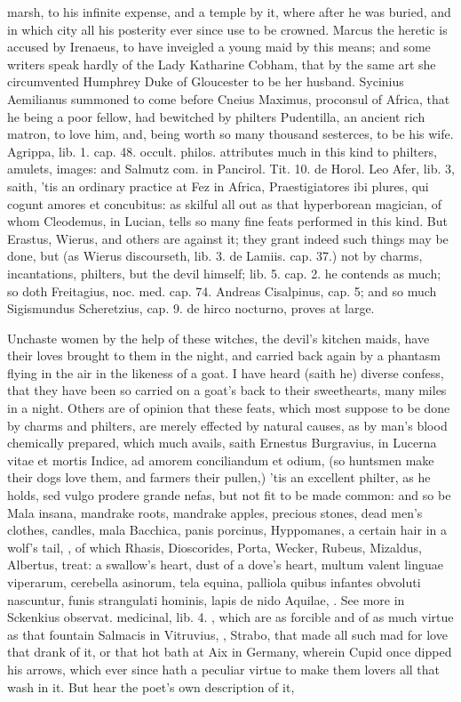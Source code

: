 marsh, to his infinite expense, and a temple by it, where after
he was buried, and in which city all his posterity ever since use to be
crowned. Marcus the heretic is accused by Irenaeus, to have inveigled a
young maid by this means; and some writers speak hardly of the Lady
Katharine Cobham, that by the same art she circumvented Humphrey Duke
of Gloucester to be her husband. Sycinius Aemilianus summoned
\Apuleius to come before Cneius Maximus, proconsul of Africa, that
he being a poor fellow, had bewitched by philters Pudentilla, an
ancient rich matron, to love him, and, being worth so many thousand
sesterces, to be his wife. Agrippa, lib. 1. cap. 48. occult. philos.
attributes much in this kind to philters, amulets, images: and Salmutz
com. in Pancirol. Tit. 10. de Horol. Leo Afer, lib. 3, saith, 'tis an
ordinary practice at Fez in Africa, Praestigiatores ibi plures, qui
cogunt amores et concubitus: as skilful all out as that hyperborean
magician, of whom Cleodemus, in  Lucian, tells so many fine feats
performed in this kind. But Erastus, Wierus, and others are against it;
they grant indeed such things may be done, but (as Wierus discourseth,
lib. 3. de Lamiis. cap. 37.) not by charms, incantations, philters, but
the devil himself; lib. 5. cap. 2. he contends as much; so doth
Freitagius, noc. med. cap. 74. Andreas Cisalpinus, cap. 5; and so much
Sigismundus Scheretzius, cap. 9. de hirco nocturno, proves at large.

Unchaste women by the help of these witches, the devil's kitchen
maids, have their loves brought to them in the night, and carried back
again by a phantasm flying in the air in the likeness of a goat. I have
heard (saith he) diverse confess, that they have been so carried on a
goat's back to their sweethearts, many miles in a night. Others are of
opinion that these feats, which most suppose to be done by charms and
philters, are merely effected by natural causes, as by man's blood
chemically prepared, which much avails, saith Ernestus Burgravius, in
Lucerna vitae et mortis Indice, ad amorem conciliandum et odium, (so
huntsmen make their dogs love them, and farmers their pullen,) 'tis an
excellent philter, as he holds, sed vulgo prodere grande nefas, but not
fit to be made common: and so be Mala insana, mandrake roots, mandrake
apples, precious stones, dead men's clothes, candles, mala
Bacchica, panis porcinus, Hyppomanes, a certain hair in a wolf's
tail, \etc{}, of which Rhasis, Dioscorides, Porta, Wecker, Rubeus,
Mizaldus, Albertus, treat: a swallow's heart, dust of a dove's heart,
multum valent linguae viperarum, cerebella asinorum, tela equina,
palliola quibus infantes obvoluti nascuntur, funis strangulati hominis,
lapis de nido Aquilae, \etc{}. See more in Sckenkius observat. medicinal,
lib. 4. \etc{}, which are as forcible and of as much virtue as that
fountain Salmacis in  Vitruvius, \Ovid, Strabo, that made all such
mad for love that drank of it, or that hot bath at Aix in
Germany, wherein Cupid once dipped his arrows, which ever since hath a
peculiar virtue to make them lovers all that wash in it. But hear the
poet's own description of it,

